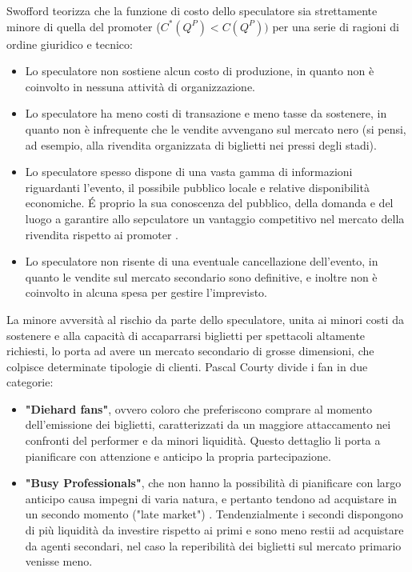 Swofford teorizza che la funzione di costo dello speculatore sia strettamente minore di quella del promoter ($C^{*}(Q^{P}) < C(Q^{P}))$ per una serie di ragioni di ordine giuridico e tecnico:
\begin{itemize}
\item Lo speculatore non sostiene alcun costo di produzione, in quanto non è coinvolto in nessuna attività di organizzazione.
\item Lo speculatore ha meno costi di transazione e meno tasse da sostenere, in quanto non è infrequente che le vendite avvengano sul mercato nero (si pensi, ad esempio, alla rivendita organizzata di biglietti nei pressi degli stadi).
\item Lo speculatore spesso dispone di una vasta gamma di informazioni riguardanti l'evento, il possibile pubblico locale e relative disponibilità economiche. \'E proprio la sua conoscenza del pubblico, della domanda e del luogo a garantire allo sepculatore un vantaggio competitivo nel mercato della rivendita rispetto ai promoter \cite{bhave2017primary}. 
\item Lo speculatore non risente di una eventuale cancellazione dell'evento, in quanto le vendite sul mercato secondario sono definitive, e inoltre non è coinvolto in alcuna spesa per gestire l'imprevisto.
\end{itemize}
La minore avversità al rischio da parte dello speculatore, unita ai minori costi da sostenere e alla capacità di accaparrarsi biglietti per spettacoli altamente richiesti, lo porta ad avere un mercato secondario di grosse dimensioni, che colpisce determinate tipologie di clienti.
Pascal Courty \cite{courty2003some} divide i fan in due categorie: 
\begin{itemize}
	\item \textbf{"Diehard fans"}, ovvero coloro che preferiscono comprare al momento dell'emissione dei biglietti, caratterizzati da un maggiore attaccamento nei confronti del performer e da minori liquidità. Questo dettaglio li porta a pianificare con attenzione e anticipo la propria partecipazione. 
	\item \textbf{"Busy Professionals"}, che non hanno la possibilità di pianificare con largo anticipo causa impegni di varia natura, e pertanto tendono ad acquistare in un secondo momento ("late market") . Tendenzialmente i secondi dispongono di più liquidità da investire rispetto ai primi e sono meno restii ad acquistare da agenti secondari, nel caso la reperibilità dei biglietti sul mercato primario venisse meno.
\end{itemize}

